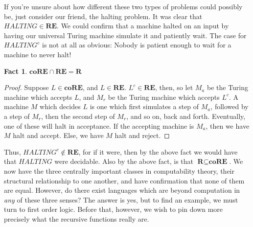 \documentclass{article}
\theoremstyle{definition}
\theoremstyle{plain}
\theoremstyle{theorem}
\newtheorem{fact}{Fact}[section]
\begin{document}
\par If you're unsure about how different these two types of problems could possibly be, just consider our friend, the halting problem. It was clear that $HALTING \in \textbf{RE}$. We could confirm that a machine halted on an input by having our universal Turing machine simulate it and patiently wait. The case for $HALTING^c$ is not at all as obvious: Nobody is patient enough to wait for a machine to never halt! 
\begin{fact}
    $\textbf{coRE} \cap \textbf{RE} = \textbf{R}$
\end{fact}
\begin{proof}
    Suppose $L \in \textbf{coRE}$, and $L \in \textbf{RE}$. $L^c \in \textbf{RE}$, then, so let $M_a$ be the Turing machine which accepts $L$, and $M_r$ be the Turing machine which accepts $L^c$. A machine $M$ which decides $L$ is one which first simulates a step of $M_a$, followed by a step of $M_r$, then the second step of $M_r$, and so on, back and forth. Eventually, one of these will halt in acceptance. If the accepting machine is $M_a$, then we have $M$ halt and accept. Else, we have $M$ halt and reject.
\end{proof}
Thus, $HALTING^c \notin \textbf{RE}$, for if it were, then by the above fact we would have that $HALTING$ were decidable. Also by the above fact, is that $\textbf{R} \subseteq \textbf{coRE}$. We now have the three centrally important classes in computability theory, their structural relationship to one another, and have confirmation that none of them are equal. However, do there exist languages which are beyond computation in \textit{any} of these three senses? The answer is yes, but to find an example, we must turn to first order logic. Before that, however, we wish to pin down more precisely what the recursive functions really are. 
\end{document}
